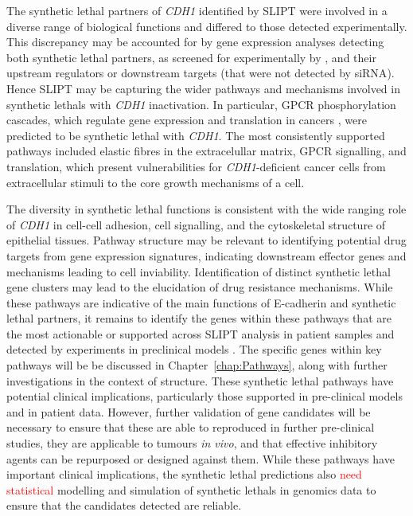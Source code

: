 The \gls{synthetic lethal} partners of \textit{CDH1} identified by \gls{SLIPT} were involved in a diverse range of biological functions and differed to those detected experimentally. This discrepancy may be accounted for by \gls{gene expression} analyses detecting both \gls{synthetic lethal} partners, as screened for experimentally by \citet{Telford2015}, and their upstream regulators or downstream targets (that were not detected by \gls{siRNA}). Hence \gls{SLIPT} may be capturing the wider \glspl{pathway} and mechanisms involved in \glspl{synthetic lethal} with \textit{CDH1} inactivation. In particular, \gls{GPCR} phosphorylation cascades, which regulate \gls{gene expression} and translation in cancers \citep{Gao2015}, were predicted to be \gls{synthetic lethal} with \textit{CDH1}. 
The most consistently supported \glspl{pathway} included elastic fibres in the extracelullar matrix, \gls{GPCR} signalling, and translation, which present vulnerabilities for \textit{CDH1}-deficient cancer cells from extracellular stimuli to the core growth mechanisms of a cell.

The diversity in \gls{synthetic lethal} functions is consistent with the wide ranging role of \textit{CDH1} in cell-cell adhesion, cell signalling, and the cytoskeletal structure of epithelial tissues. Pathway structure may be relevant to identifying potential drug targets from \gls{gene expression} signatures, indicating downstream effector genes and mechanisms leading to cell inviability. Identification of distinct \gls{synthetic lethal} gene clusters may lead to the elucidation of drug resistance mechanisms. While these \glspl{pathway} are indicative of the main functions of \gls{E-cadherin} and \gls{synthetic lethal} partners, it remains to identify the genes within these \glspl{pathway} that are the most actionable or supported across \gls{SLIPT} analysis in patient samples and detected by experiments in preclinical models \citep{Chen2014, Telford2015}.  The specific genes within key \glspl{pathway} will be be discussed in Chapter~\ref{chap:Pathways}, along with further investigations in the context of  structure. These \gls{synthetic lethal} \glspl{pathway} have potential clinical implications, particularly those supported in pre-clinical models and in patient  data. However, further validation of gene candidates will be necessary to ensure that these are able to reproduced in further pre-clinical studies, they are applicable to tumours \textit{in vivo}, and that effective inhibitory agents can be repurposed or designed against them. While these \glspl{pathway} have important clinical implications, the \gls{synthetic lethal} predictions also \textcolor{red}{need statistical} modelling and simulation of \glspl{synthetic lethal} in \glspl{genomic}  data to ensure that the candidates detected are reliable.


